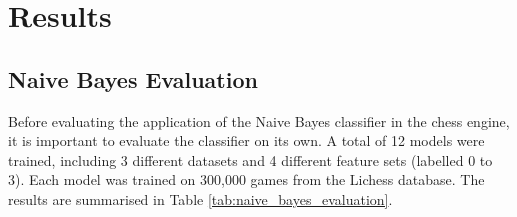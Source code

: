 \chapter{Results}


\section{Naive Bayes Evaluation}

Before evaluating the application of the Naive Bayes classifier in the chess engine, it is important to evaluate the classifier on its own. A total of 12 models were trained, including 3 different datasets and 4 different feature sets (labelled 0 to 3). Each model was trained on 300,000 games from the Lichess database. The results are summarised in Table \ref{tab:naive_bayes_evaluation}.



